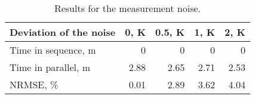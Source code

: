\begin{table}[h]
  \centering
  \caption{Results for the measurement noise.}
  \begin{tabular*}{0.80\linewidth}{lrrrr}
    \toprule
    Deviation of the noise & 0, K & 0.5, K & 1, K & 2, K \\
    \midrule
    Time in sequence, m & 0 & 0 & 0 & 0 \\
    Time in parallel, m & 2.88 & 2.65 & 2.71 & 2.53 \\
    NRMSE, \%           & 0.01 & 2.89 & 3.62 & 4.04 \\
    \bottomrule
  \end{tabular*}
  \vspace{-1em}
\end{table}

